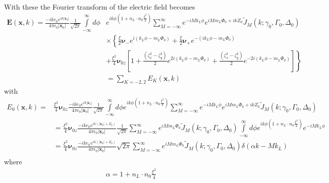 With these the Fourier transform of the electric field becomes
\begin{align}
    {\bm E}({\bm x},k) =\frac{-i k e_0 e^{ik |{\bm x}_0|}}{4\pi\epsilon_0|{\bm x}_0|}\frac1{\sqrt{2\pi}}\int\limits_{-\infty}^{\infty}d\phi & e^{ik\phi(1+n_L\cdot n_0\frac{\xi^2}4)}\sum\limits_{M=-\infty}^{\infty}e^{-iMk_L\phi}e^{iMm_L\varPhi_0+ikZ_0}\tilde J_M(k;\gamma_0,\Gamma_0,\Delta_0)\nonumber \\& \times\left\{\frac{\xi}2{\boldsymbol{\nu}}_{-} e^{i(k_L\phi -m_L\varPhi_0)}+\frac{\xi}2{\boldsymbol{\nu}}_{+}e^{-(ik_L\phi -m_L\varPhi_0)}\right.\nonumber                                                                                                              \\&+\left.\frac{\xi^2}4{\boldsymbol{\nu}_{0z}}\left[1+\frac{(\zeta_x^2-\zeta_y^2)}2e^{2i(k_L\phi-m_L\varPhi_0)}+\frac{(\zeta_x^2-\zeta_y^2)}2e^{-2i(k_L\phi-m_L\varPhi_0)}\right]\right\}\nonumber\\
                                                                                                                                            & =\sum\limits_{K=-2,2}E_K({\bm x},k)
\end{align}
with
\begin{align}
    E_0({\bm x},k) = & \frac{\xi^2}4{\boldsymbol{\nu}_{0z}}   \frac{-i k e_0 e^{ik |{\bm x}_0|}}{4\pi\epsilon_0|{\bm x}_0|}\frac1{\sqrt{2\pi}}\int\limits_{-\infty}^{\infty}d\phi  e^{ik\phi(1+n_L\cdot n_0\frac{\xi^2}4)}\sum\limits_{M=-\infty}^{\infty}e^{-iMk_L\phi}e^{iMm_L\varPhi_0+ikZ_0}\tilde J_M(k;\gamma_0,\Gamma_0,\Delta_0)\nonumber                                                                 \\
                     & =\frac{\xi^2}4{\boldsymbol{\nu}_{0z}}   \frac{-i k e_0 e^{ik (|{\bm x}_0|+Z_0)}}{4\pi\epsilon_0|{\bm x}_0|}\frac1{\sqrt{2\pi}}\sum\limits_{M=-\infty}^{\infty} e^{iMm_L\varPhi_0}\tilde J_M(k;\gamma_0,\Gamma_0,\Delta_0)\int\limits_{-\infty}^{\infty}d\phi                                                                e^{ik\phi(1+n_L\cdot n_0\frac{\xi^2}4)}e^{-iMk_L\phi}\nonumber \\
                     & =\frac{\xi^2}4{\boldsymbol{\nu}_{0z}}   \frac{-i k e_0 e^{ik (|{\bm x}_0|+Z_0)}}{4\pi\epsilon_0|{\bm x}_0|}{\sqrt{2\pi}}\sum\limits_{M=-\infty}^{\infty} e^{iMm_L\varPhi_0}\tilde J_M(k;\gamma_0,\Gamma_0,\Delta_0)\delta(                                                            \alpha k-Mk_L)\nonumber                                                                              \\
\end{align}
where
\begin{align}
    \alpha = 1+n_L\cdot n_0\frac{\xi^2}4
\end{align}

